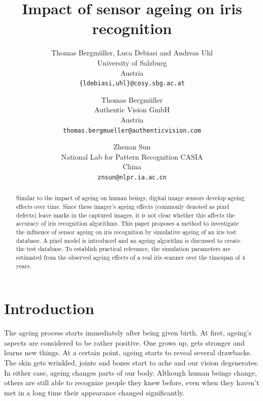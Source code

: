 \documentclass[10pt,twocolumn,letterpaper]{article}
\begin{document}
\title{Impact of sensor ageing on iris recognition}

\author{Thomas Bergm{\"u}ller, Luca Debiasi and Andreas Uhl\\
University of Salzburg\\
Austria\\
{\tt\small \{ldebiasi,uhl\}@cosy.sbg.ac.at}
\and
Thomas Bergm{\"u}ller \\
Authentic Vision GmbH\\
Austria\\
{\tt\small thomas.bergmueller@authenticvision.com}
\and
Zhenan Sun\\
National Lab for Pattern Recognition CASIA\\
China\\
{\tt\small znsun@nlpr.ia.ac.cn}
}

\maketitle
\thispagestyle{empty}

\begin{abstract}
   Similar to the impact of ageing on human beings, digital image sensors develop ageing effects over time. Since these imager's ageing effects (commonly denoted as pixel defects) leave marks in the captured images, it is not clear whether this affects the accuracy of iris recognition algorithms. This paper proposes a method to investigate the influence of sensor ageing on iris recognition by simulative ageing of an iris test database. A pixel model is introduced and an ageing algorithm is discussed to create the test database. To establish practical relevance, the simulation parameters are estimated from the observed ageing effects of a real iris scanner over the timespan of 4 years.
\end{abstract}




\section{Introduction}
The ageing process starts immediately after being given birth. At first, ageing's aspects are considered to be rather positive. One grows up, gets stronger and learns new things. At a certain point, ageing starts to reveal several drawbacks. The skin gets wrinkled, joints and bones start to ache and our vision degenerates. In either case, ageing changes parts of our body. Although human beings change, others are still able to recognize people they knew before, even when they haven't met in a long time their appearance changed significantly.
\end{document}
